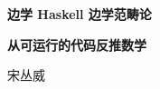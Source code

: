\documentclass[11pt,a4paper,fontset=fandol]{ctexbook}
\begin{document}
\begin{titlepage}
  \centering
  \vspace*{3.2cm}
  {\Large\bfseries 边学 Haskell 边学范畴论\par}
  \vspace{0.4cm}
  {\large\bfseries 从可运行的代码反推数学\par}
  \vspace{1.2cm}
  {\large 宋丛威\par}
\end{titlepage}

\frontmatter

\tableofcontents

\mainmatter
\setcounter{secnumdepth}{3}

\end{document}
